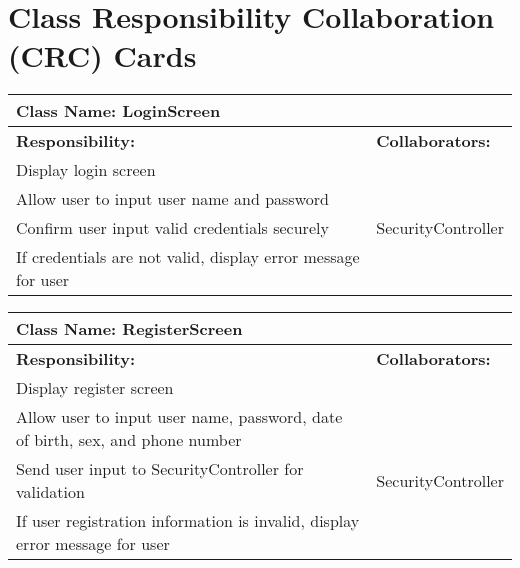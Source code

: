 \documentclass[english]{article}
\begin{document}

    
\section{Class Responsibility Collaboration (CRC) Cards}
\label{sec:class_responsibility_collaboration_crc_cards}
    
    \begin{table}[!ht]
        \centering
        \begin{tabular}{|p{8cm}|p{4cm}|}
        \hline 
        \multicolumn{2}{|l|}{\textbf{Class Name: LoginScreen}} \\
        \hline
        \textbf{Responsibility:} & \textbf{Collaborators:} \\
        \hline
        Display login screen &  \\
        \hline
        Allow user to input user name and password & \\
        \hline
        Confirm user input valid credentials securely & SecurityController \\
        \hline
        If credentials are not valid, display error message for user & \\
        \hline
        \end{tabular}
    \end{table}
    
    \begin{table}[!ht]
        \centering
        \begin{tabular}{|p{8cm}|p{4cm}|}
        \hline 
        \multicolumn{2}{|l|}{\textbf{Class Name: RegisterScreen}} \\
        \hline
        \textbf{Responsibility:} & \textbf{Collaborators:} \\
        \hline
        Display register screen &  \\
        \hline
        Allow user to input user name, password, date of birth, sex, and phone number & \\
        \hline
        Send user input to SecurityController for validation & SecurityController\\
        \hline 
        If user registration information is invalid, display error message for user & \\
        \hline
        \end{tabular}
    \end{table}
    
\end{document}

